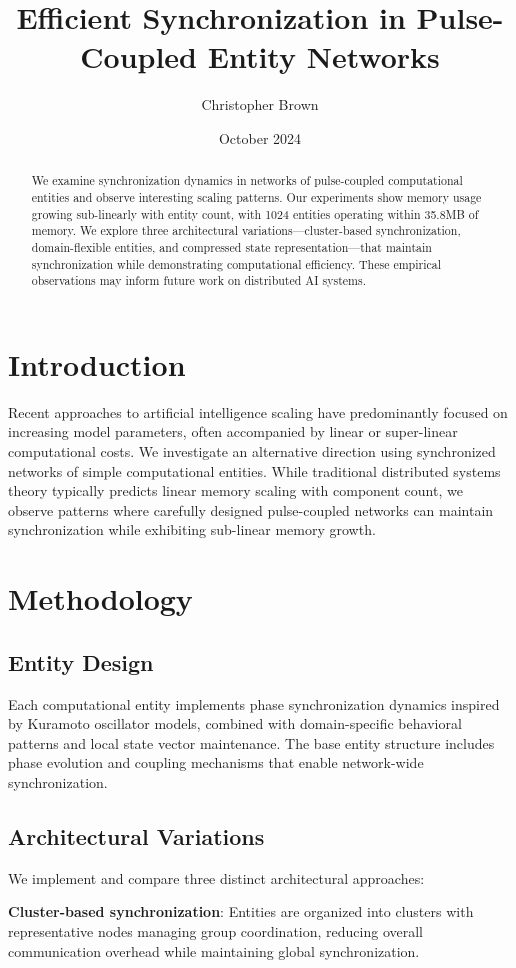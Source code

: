 \documentclass[12pt]{article}
\title{Efficient Synchronization in Pulse-Coupled Entity Networks}
\author{Christopher Brown}
\date{October 2024}
\begin{document}
\maketitle

\begin{abstract}
We examine synchronization dynamics in networks of pulse-coupled computational entities and observe interesting scaling patterns. Our experiments show memory usage growing sub-linearly with entity count, with 1024 entities operating within 35.8MB of memory. We explore three architectural variations—cluster-based synchronization, domain-flexible entities, and compressed state representation—that maintain synchronization while demonstrating computational efficiency. These empirical observations may inform future work on distributed AI systems.
\end{abstract}

\section{Introduction}
Recent approaches to artificial intelligence scaling have predominantly focused on increasing model parameters, often accompanied by linear or super-linear computational costs. We investigate an alternative direction using synchronized networks of simple computational entities. While traditional distributed systems theory typically predicts linear memory scaling with component count, we observe patterns where carefully designed pulse-coupled networks can maintain synchronization while exhibiting sub-linear memory growth.

\section{Methodology}

\subsection{Entity Design}
Each computational entity implements phase synchronization dynamics inspired by Kuramoto oscillator models, combined with domain-specific behavioral patterns and local state vector maintenance. The base entity structure includes phase evolution and coupling mechanisms that enable network-wide synchronization.

\subsection{Architectural Variations}
We implement and compare three distinct architectural approaches:

\textbf{Cluster-based synchronization}: Entities are organized into clusters with representative nodes managing group coordination, reducing overall communication overhead while maintaining global synchronization.

\text
\end{document}
